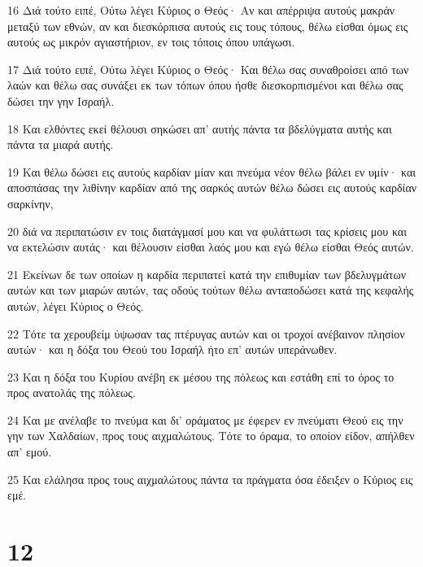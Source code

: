 \par 16 Διά τούτο ειπέ, Ούτω λέγει Κύριος ο Θεός· Αν και απέρριψα αυτούς μακράν μεταξύ των εθνών, αν και διεσκόρπισα αυτούς εις τους τόπους, θέλω είσθαι όμως εις αυτούς ως μικρόν αγιαστήριον, εν τοις τόποις όπου υπάγωσι.
\par 17 Διά τούτο ειπέ, Ούτω λέγει Κύριος ο Θεός· Και θέλω σας συναθροίσει από των λαών και θέλω σας συνάξει εκ των τόπων όπου ήσθε διεσκορπισμένοι και θέλω σας δώσει την γην Ισραήλ.
\par 18 Και ελθόντες εκεί θέλουσι σηκώσει απ' αυτής πάντα τα βδελύγματα αυτής και πάντα τα μιαρά αυτής.
\par 19 Και θέλω δώσει εις αυτούς καρδίαν μίαν και πνεύμα νέον θέλω βάλει εν υμίν· και αποσπάσας την λιθίνην καρδίαν από της σαρκός αυτών θέλω δώσει εις αυτούς καρδίαν σαρκίνην,
\par 20 διά να περιπατώσιν εν τοις διατάγμασί μου και να φυλάττωσι τας κρίσεις μου και να εκτελώσιν αυτάς· και θέλουσιν είσθαι λαός μου και εγώ θέλω είσθαι Θεός αυτών.
\par 21 Εκείνων δε των οποίων η καρδία περιπατεί κατά την επιθυμίαν των βδελυγμάτων αυτών και των μιαρών αυτών, τας οδούς τούτων θέλω ανταποδώσει κατά της κεφαλής αυτών, λέγει Κύριος ο Θεός.
\par 22 Τότε τα χερουβείμ ύψωσαν τας πτέρυγας αυτών και οι τροχοί ανέβαινον πλησίον αυτών· και η δόξα του Θεού του Ισραήλ ήτο επ' αυτών υπεράνωθεν.
\par 23 Και η δόξα του Κυρίου ανέβη εκ μέσου της πόλεως και εστάθη επί το όρος το προς ανατολάς της πόλεως.
\par 24 Και με ανέλαβε το πνεύμα και δι' οράματος με έφερεν εν πνεύματι Θεού εις την γην των Χαλδαίων, προς τους αιχμαλώτους. Τότε το όραμα, το οποίον είδον, απήλθεν απ' εμού.
\par 25 Και ελάλησα προς τους αιχμαλώτους πάντα τα πράγματα όσα έδειξεν ο Κύριος εις εμέ.

\chapter{12}

